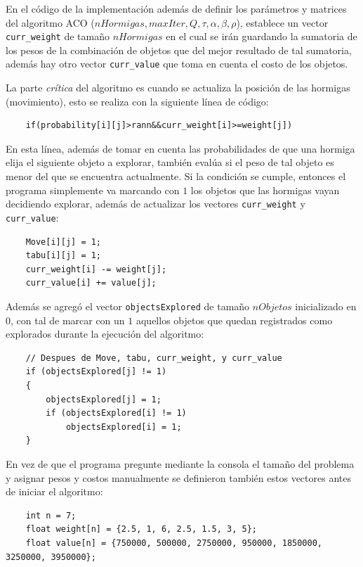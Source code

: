 \documentclass[12pt, a4paper]{article}
\begin{document}
En el código de la implementación además de definir los parámetros y matrices del algoritmo ACO ($nHormigas, maxIter, Q, \tau, \alpha, \beta, \rho$), establece un vector \lstinline{curr_weight} de tamaño $nHormigas$ en el cual se irán guardando la sumatoria de los pesos de la combinación de objetos que del mejor resultado de tal sumatoria, además hay otro vector \lstinline{curr_value} que toma en cuenta el costo de los objetos.

La parte \emph{crítica} del algoritmo es cuando se actualiza la posición de las hormigas (movimiento), esto se realiza con la siguiente línea de código:

\begin{lstlisting}
    if(probability[i][j]>rann&&curr_weight[i]>=weight[j])
\end{lstlisting}

En esta línea, además de tomar en cuenta las probabilidades de que una hormiga elija el siguiente objeto a explorar, también evalúa si el peso de tal objeto es menor del que se encuentra actualmente. Si la condición se cumple, entonces el programa simplemente va marcando con $1$ los objetos que las hormigas vayan decidiendo explorar, además de actualizar los vectores \lstinline{curr_weight} y \lstinline{curr_value}:

\begin{lstlisting}
    Move[i][j] = 1;
    tabu[i][j] = 1;
    curr_weight[i] -= weight[j];
    curr_value[i] += value[j];
\end{lstlisting}

Además se agregó el vector \lstinline{objectsExplored} de tamaño $nObjetos$ inicializado en $0$, con tal de marcar con un $1$ aquellos objetos que quedan registrados como explorados durante la ejecución del algoritmo:

\begin{lstlisting}
    // Despues de Move, tabu, curr_weight, y curr_value
    if (objectsExplored[j] != 1)
    {
        objectsExplored[j] = 1;
        if (objectsExplored[i] != 1)
            objectsExplored[i] = 1;
    }
\end{lstlisting}

En vez de que el programa pregunte mediante la consola el tamaño del problema y asignar pesos y costos manualmente se definieron también estos vectores antes de iniciar el algoritmo:

\begin{lstlisting}
    int n = 7;
    float weight[n] = {2.5, 1, 6, 2.5, 1.5, 3, 5};
    float value[n] = {750000, 500000, 2750000, 950000, 1850000, 3250000, 3950000};
\end{lstlisting}
\end{document}
